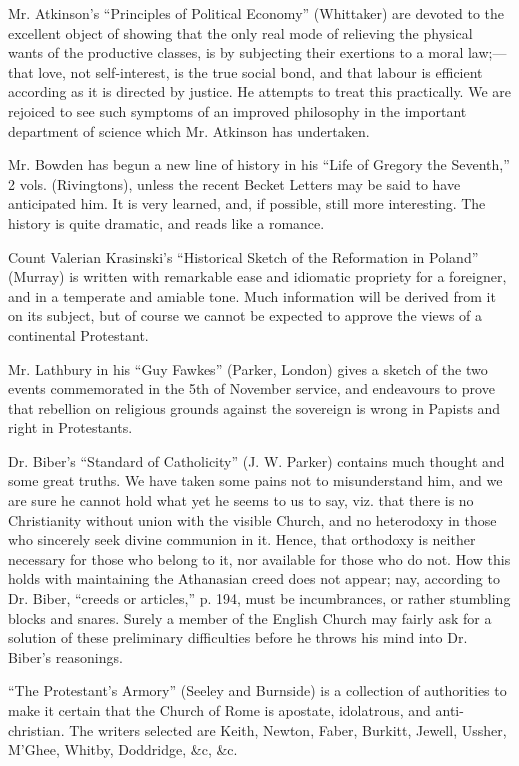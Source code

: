 Mr. Atkinson's ``Principles of Political Economy''
(Whittaker) are devoted to the excellent object of showing that the only
real mode of relieving the physical wants of the productive classes, is
by subjecting their exertions to a moral law;—that love, not
self-interest, is the true social bond, and that labour is efficient
according as it is directed by justice. He attempts to treat this
practically. We are rejoiced to see such symptoms of an improved
philosophy in the important department of science which Mr. Atkinson has
undertaken.

Mr. Bowden has begun a new line of history in his ``Life
of Gregory the Seventh,'' 2 vols. (Rivingtons), unless the recent Becket
Letters may be said to have anticipated him. It is very learned, and, if
possible, still more interesting. The history is quite dramatic, and
reads like a romance.

Count Valerian Krasinski's ``Historical Sketch of
the Reformation in Poland'' (Murray) is written with remarkable ease and
idiomatic propriety for a foreigner, and in a temperate and amiable
tone. Much information will be derived from it on its subject, but of
course we cannot be expected to approve the views of a continental
Protestant.

Mr. Lathbury in his ``Guy Fawkes'' (Parker, London)
gives a sketch of the two events commemorated in the 5th of November
service, and endeavours to prove that rebellion on religious grounds
against the sovereign is wrong in Papists and right in Protestants.

Dr. Biber's ``Standard of Catholicity'' (J. W.
Parker) contains much thought and some great truths. We have taken some
pains not to misunderstand him, and we are sure he cannot hold what yet
he seems to us to say, viz. that there is no Christianity without union
with the visible Church, and no heterodoxy in those who sincerely seek
divine communion in it. Hence, that orthodoxy is neither necessary for
those who belong to it, nor available for those who do not. How this
holds with maintaining the Athanasian creed does not appear; nay,
according to Dr. Biber, ``creeds or articles,'' p. 194, must be
incumbrances, or rather stumbling blocks and snares. Surely a member of
the English Church may fairly ask for a solution of these preliminary
difficulties before he throws his mind into Dr. Biber's reasonings.

``The Protestant's Armory'' (Seeley and Burnside) is
a collection of authorities to make it certain that the Church of
Rome is apostate, idolatrous, and anti-christian. The writers selected
are Keith, Newton, Faber, Burkitt, Jewell, Ussher, M'Ghee, Whitby,
Doddridge, \&c, \&c.

